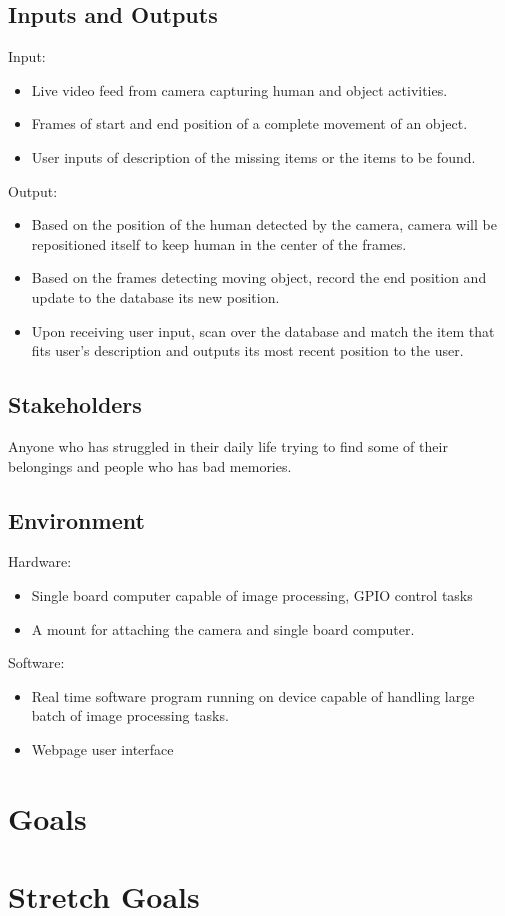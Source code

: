 \documentclass{article}
\begin{document}
\subsection{Inputs and Outputs}
Input:
\begin{itemize}
    \item Live video feed from camera capturing human and object activities. 
    \item Frames of start and end position of a complete movement of an object.
    \item User inputs of description of the missing items or the items to be found.
\end{itemize}
Output:
\begin{itemize}
    \item Based on the position of the human detected by the camera, camera will be repositioned itself to keep human in the center of the frames.
    \item Based on the frames detecting moving object, record the end position and update to the database its new position.
    \item Upon receiving user input, scan over the database and match the item that fits user's description and outputs its most recent position to the user.
\end{itemize}
\subsection{Stakeholders}
Anyone who has struggled in their daily life trying to find some of their belongings and people who has bad memories.
\subsection{Environment}

Hardware:
\begin{itemize}
    \item Single board computer capable of image processing, GPIO control tasks
    \item A mount for attaching the camera and single board computer.
\end{itemize}
Software:
\begin{itemize}
    \item Real time software program running on device capable of handling large batch of image processing tasks.
    \item Webpage user interface

\end{itemize}

\section{Goals}

\section{Stretch Goals}
\end{document}
